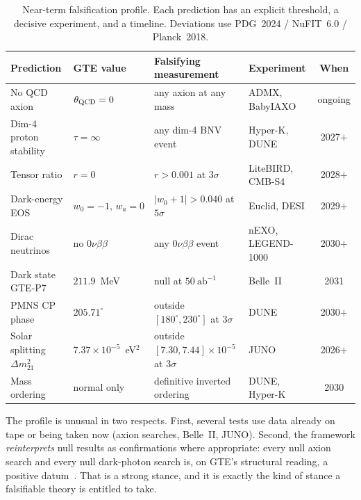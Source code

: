 \documentclass[11pt]{article}
\begin{document}
\begin{table}[htbp]
\centering
\caption{Near-term falsification profile.  Each prediction has an explicit
threshold, a decisive experiment, and a timeline.  Deviations use PDG~2024 /
NuFIT~6.0 / Planck~2018.}
\label{tab:falsify}
\small\renewcommand{\arraystretch}{1.2}
\begin{tabularx}{\textwidth}{@{}P{3.0cm}P{2.7cm}Y P{2.0cm}c@{}}
\toprule
\textbf{Prediction} & \textbf{GTE value} & \textbf{Falsifying measurement} &
  \textbf{Experiment} & \textbf{When} \\
\midrule
No QCD axion & $\theta_{\rm QCD}=0$ & any axion at any mass & ADMX, BabyIAXO & ongoing \\
Dim-4 proton stability & $\tau=\infty$ & any dim-4 BNV event & Hyper-K, DUNE & 2027$+$ \\
Tensor ratio & $r=0$ & $r>0.001$ at $3\sigma$ & LiteBIRD, CMB-S4 & 2028$+$ \\
Dark-energy EOS & $w_0=-1,\,w_a=0$ & $|w_0+1|>0.040$ at $5\sigma$ & Euclid, DESI & 2029$+$ \\
Dirac neutrinos & no $0\nu\beta\beta$ & any $0\nu\beta\beta$ event & nEXO, LEGEND-1000 & 2030$+$ \\
Dark state GTE-P7 & $211.9$~MeV & null at $50~\mathrm{ab}^{-1}$ & Belle~II & 2031 \\
PMNS CP phase & $205.71^\circ$ & outside $[180^\circ,230^\circ]$ at $3\sigma$ & DUNE & 2030$+$ \\
Solar splitting $\Delta m^2_{21}$ & $7.37\times10^{-5}$~eV$^2$ & outside $[7.30,7.44]\times10^{-5}$ at $3\sigma$ & JUNO & 2026$+$ \\
Mass ordering & normal only & definitive inverted ordering & DUNE, Hyper-K & 2030 \\
\bottomrule
\end{tabularx}
\end{table}

\FloatBarrier

\noindent
The profile is unusual in two respects.  First, several tests use data already on
tape or being taken now (axion searches, Belle~II, JUNO).  Second, the framework
\emph{reinterprets} null results as confirmations where appropriate: every null
axion search and every null dark-photon search is, on GTE's structural reading, a
positive datum~\cite{SpivackMirrorBraidAtlas}.  That is a strong stance, and it is
exactly the kind of stance a falsifiable theory is entitled to take.

\end{document}
